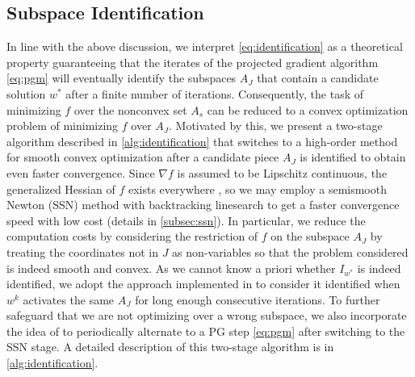 \documentclass{article}
\theoremstyle{plain}
\theoremstyle{definition}
\theoremstyle{remark}
\begin{document}
\subsection{Subspace Identification}
\label{sec:identify}

In line with the above discussion, we interpret 
\cref{eq:identification} 
as a theoretical property guaranteeing that the iterates of the projected gradient algorithm 
\cref{eq:pgm}
will eventually identify the subspaces $A_J$ that contain a candidate solution 
$w^*$ after a finite number of iterations. Consequently, the task of minimizing
$f$ over the nonconvex set $A_s$ can be reduced to a convex optimization 
problem of minimizing $f$ over $A_J$. Motivated by this, we present a 
two-stage algorithm described in \cref{alg:identification} that switches to 
a high-order method for smooth convex optimization after a candidate
piece $A_J$ is identified to obtain even faster convergence.
Since $\nabla f$ is assumed to be 
Lipschitz continuous, the generalized Hessian of $f$ exists everywhere
\citep{HUJ84a}, so we may employ a semismooth Newton
(SSN) method \citep{QiS93a} with backtracking linesearch to get a faster
convergence speed with low cost (details in \cref{subsec:ssn}). In particular, we 
reduce the computation costs by considering the restriction of $f$ on the
subspace $A_J$ by 
treating
the coordinates not in $J$ as non-variables so that the problem
considered is indeed smooth and convex.
As we cannot know a priori whether $I_{w^*}$ is indeed identified,
we adopt the approach implemented in 
\cite{LeeW12a,YSL20a-nourl,LeeCP20-nourl} to consider it
identified when $w^k$ activates the same $A_J$ for long enough
consecutive iterations.
To further safeguard that we are not optimizing over a wrong subspace,
we also incorporate the idea of
\cite{Wri12a,BarIM20a,YSL20a-nourl,LeeCP20-nourl}
to periodically alternate to a PG step \cref{eq:pgm} after switching
to the SSN stage.
A detailed description of this two-stage algorithm is in
\cref{alg:identification}.
\end{document}
